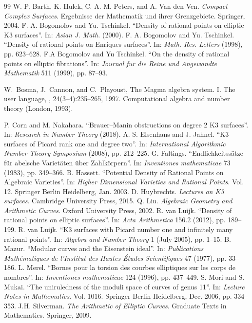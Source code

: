 \documentclass[11pt]{amsart}
\theoremstyle{plain}
\theoremstyle{remark}
\begin{document}
\begin{thebibliography}{99}
{}
W. P. Barth, K. Hulek, C. A. M. Peters, and A. Van den Ven. \emph{Compact
Complex Surfaces}. Ergebnisse der Mathematik und ihrer Grenzgebiete. Springer, 2004.
{}
F. A. Bogomolov and Yu. Tschinkel. “Density of rational points on elliptic K3 surfaces”.
In: \emph{Asian J. Math.} (2000).
{}
F. A. Bogomolov and Yu. Tschinkel. “Density of rational points on Enriques surfaces”.
In: \emph{Math. Res. Letters} (1998), pp. 623–628.
{}
F.A Bogomolov and Yu Tschinkel. “On the density of rational points on elliptic
fibrations”. In: \emph{Journal fur die Reine und Angewandte Mathematik} 511 (1999),
pp. 87–93.
{}

W.~Bosma, J.~Cannon, and C.~Playoust,
\newblock The Magma algebra system. I. The user language,
, 24(3--4):235--265, 1997.
\newblock Computational algebra and number theory (London, 1993).

P. Corn and M. Nakahara. “Brauer–Manin obstructions on degree 2 K3 surfaces”. In:
\emph{Research in Number Theory} (2018).
{}
A. S. Elsenhans and J. Jahnel. “K3 surfaces of Picard rank one and degree two”. In:
\emph{International Algorithmic Number Theory Symposium} (2008), pp. 212–225.
{}
G. Faltings. “Endlichkeitssätze für abelsche Varietäten über Zahlkörpern”. In:
\emph{Inventiones mathematicae} 73 (1983), pp. 349–366.
{}
B. Hassett. “Potential Density of Rational Points on Algebraic Varieties”. In:
\emph{Higher Dimensional Varieties and Rational Points}. Vol. 12. Springer Berlin
Heidelberg, Jan. 2003.
{}
D. Huybrechts. \emph{Lectures on K3 surfaces}. Cambridge University Press, 2015.
{}
Q. Liu. \emph{Algebraic Geometry and Arithmetic Curves}. Oxford University Press,
2002.
{}
R. van Luijk. “Density of rational points on elliptic surfaces”. In: \emph{Acta
Arithmetica} 156.2 (2012), pp. 189–199.
{}
R. van Luijk. “K3 surfaces with Picard number one and infinitely many rational
points”. In: \emph{Algebra and Number Theory} 1 (July 2005), pp. 1–15.
{}
B. Mazur. “Modular curves and the Eisenstein ideal”. In: \emph{Publications
Mathématiques de l’Institut des Hautes Études Scientifiques} 47 (1977), pp. 33–186.
{}
L. Merel. “Bornes pour la torsion des courbes elliptiques sur les corps de nombres”. In:
\emph{Inventiones mathematicae} 124 (1996), pp. 437–449.
{}
S. Mori and S. Mukai. “The uniruledness of the moduli space of curves of genus 11”. In:
\emph{Lecture Notes in Mathematics}. Vol. 1016. Springer Berlin Heidelberg, Dec. 2006,
pp. 334–353.
{}
J.H. Silverman. \emph{The Arithmetic of Elliptic Curves}. Graduate Texts in
Mathematics. Springer, 2009.
\end{thebibliography}
\end{document}

